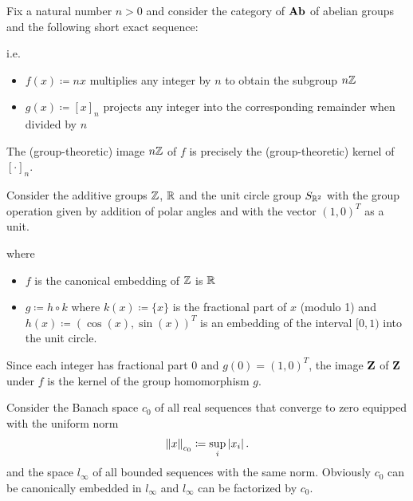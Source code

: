 \begin{example}\label{ex:short_exact_sequences}
  \mbox{}
  \begin{defenum}
    \item Fix a natural number $n > 0$ and consider the category of $\operatorname{\mathbf{Ab}}$ of abelian groups and the following short exact sequence:
    \begin{center}
    \end{center}
    i.e.
    \begin{itemize}
      \item $f(x) \coloneqq nx$ multiplies any integer by $n$ to obtain the subgroup $n \mathbb Z$
      \item $g(x) \coloneqq [x]_n$ projects any integer into the corresponding remainder when divided by $n$
    \end{itemize}

    The (group-theoretic) image $n \mathbb Z$ of $f$ is precisely the (group-theoretic) kernel of $[\cdot]_n$.

    \item Consider the additive groups $\mathbb Z$, $\mathbb R$ and the unit circle group $S_{\mathbb R^2}$ with the group operation given by addition of polar angles and with the vector $(1, 0)^T$ as a unit.
    \begin{center}
    \end{center}
    where
    \begin{itemize}
      \item $f$ is the canonical embedding of $\mathbb Z$ is $\mathbb R$
      \item $g \coloneqq h \circ k$ where $k(x) \coloneqq \{ x \}$ is the fractional part of $x$ (modulo 1) and $h(x) \coloneqq (\cos(x), \sin(x))^T$ is an embedding of the interval $[0, 1)$ into the unit circle.
    \end{itemize}

    Since each integer has fractional part $0$ and $g(0) = (1, 0)^T$, the image $\operatorname{\mathbf{Z}}$ of $\operatorname{\mathbf{Z}}$ under $f$ is the kernel of the group homomorphism $g$.

    \item Consider the Banach space $c_0$ of all real sequences that converge to zero equipped with the uniform norm
    \begin{align*}
      \left\Vert x \right\Vert_{c_0} \coloneqq \sup_i \left\vert x_i \right\vert.
    \end{align*}
    and the space $l_\infty$ of all bounded sequences with the same norm. Obviously $c_0$ can be canonically embedded in $l_\infty$ and $l_\infty$ can be factorized by $c_0$.


\end{defenum}
\end{example}
